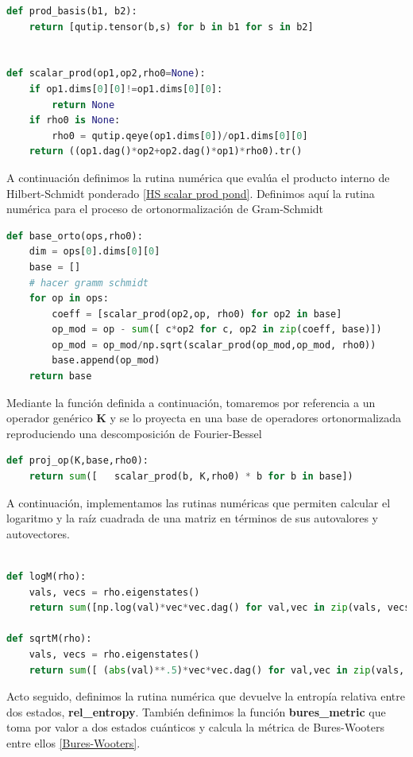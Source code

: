 \documentclass{report} %
\numberwithin{equation}{section}
\begin{document}
\begin{lstlisting}[language=Python]
def prod_basis(b1, b2):
    return [qutip.tensor(b,s) for b in b1 for s in b2]


def scalar_prod(op1,op2,rho0=None):
    if op1.dims[0][0]!=op1.dims[0][0]:
        return None
    if rho0 is None:
        rho0 = qutip.qeye(op1.dims[0])/op1.dims[0][0]
    return ((op1.dag()*op2+op2.dag()*op1)*rho0).tr()
\end{lstlisting}

A continuación definimos la rutina numérica que evalúa el producto interno de Hilbert-Schmidt ponderado \eqref{HS scalar prod pond}. Definimos aquí la rutina numérica para el proceso de ortonormalización de Gram-Schmidt

\begin{lstlisting}[language=Python]
def base_orto(ops,rho0):
    dim = ops[0].dims[0][0]
    base = []
    # hacer gramm schmidt
    for op in ops:
        coeff = [scalar_prod(op2,op, rho0) for op2 in base]
        op_mod = op - sum([ c*op2 for c, op2 in zip(coeff, base)])
        op_mod = op_mod/np.sqrt(scalar_prod(op_mod,op_mod, rho0))
        base.append(op_mod)
    return base
\end{lstlisting}

Mediante la función definida a continuación, tomaremos por referencia a un operador genérico $\mathbf{K}$ y se lo proyecta en una base de operadores ortonormalizada reproduciendo una descomposición de Fourier-Bessel 

\begin{lstlisting}[language=Python]
def proj_op(K,base,rho0):
    return sum([   scalar_prod(b, K,rho0) * b for b in base])
\end{lstlisting}

A continuación, implementamos las rutinas numéricas que permiten calcular el logaritmo y la raíz cuadrada de una matriz en términos de sus autovalores y autovectores. 

\begin{lstlisting}[language=Python]

def logM(rho):
    vals, vecs = rho.eigenstates()
    return sum([np.log(val)*vec*vec.dag() for val,vec in zip(vals, vecs) if val>0])

def sqrtM(rho):
    vals, vecs = rho.eigenstates()
    return sum([ (abs(val)**.5)*vec*vec.dag() for val,vec in zip(vals, vecs)])

\end{lstlisting}

Acto seguido, definimos la rutina numérica que devuelve la entropía relativa entre dos estados, \textbf{rel_entropy}. También definimos la función \textbf{bures_metric} que toma por valor a dos estados cuánticos y calcula la métrica de Bures-Wooters entre ellos \eqref{Bures-Wooters}. 
\end{document}
